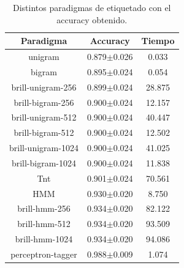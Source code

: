 \documentclass[11pt,a4paper]{report}
\begin{document}
			\begin{table}[thb!]
		\begin{center} 		
			\begin{tabular}{ccc} 
				\hline	
				\textbf{Paradigma}&\textbf{Accuracy}&\textbf{Tiempo}\\
				\hline
	            unigram&0.879$\pm$0.026&0.033\\
                bigram&0.895$\pm$0.024&0.054\\
                brill-unigram-256&0.899$\pm$0.024&28.875\\
                brill-bigram-256&0.900$\pm$0.024&12.157\\
                brill-unigram-512&0.900$\pm$0.024&40.447\\
                brill-bigram-512&0.900$\pm$0.024&12.502\\
                brill-unigram-1024&0.900$\pm$0.024&41.025\\
                brill-bigram-1024&0.900$\pm$0.024&11.838\\
                Tnt&0.901$\pm$0.024&70.561\\
                HMM&0.930$\pm$0.020&8.750\\
                brill-hmm-256&0.934$\pm$0.020&82.122\\
                brill-hmm-512&0.934$\pm$0.020&93.509\\
                brill-hmm-1024&0.934$\pm$0.020&94.086\\
                perceptron-tagger&0.988$\pm$0.009&1.074\\
				\hline
			\end{tabular}
			\caption{Distintos paradigmas de etiquetado con el accuracy obtenido.}	
			\label{table-task4}
		\end{center}
	\end{table}		
	
\end{document}
